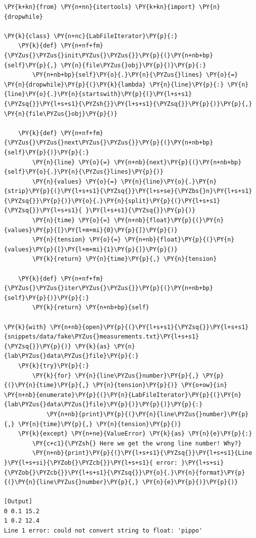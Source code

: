 \begin{Verbatim}[label=\makebox{\url{https://github.com/lucabaldini/cmepda/tree/master/slides/latex/snippets/file\_iterator.py}},commandchars=\\\{\}]
\PY{k+kn}{from} \PY{n+nn}{itertools} \PY{k+kn}{import} \PY{n}{dropwhile}

\PY{k}{class} \PY{n+nc}{LabFileIterator}\PY{p}{:}
    \PY{k}{def} \PY{n+nf+fm}{\PYZus{}\PYZus{}init\PYZus{}\PYZus{}}\PY{p}{(}\PY{n+nb+bp}{self}\PY{p}{,} \PY{n}{file\PYZus{}obj}\PY{p}{)}\PY{p}{:}
        \PY{n+nb+bp}{self}\PY{o}{.}\PY{n}{\PYZus{}lines} \PY{o}{=} \PY{n}{dropwhile}\PY{p}{(}\PY{k}{lambda} \PY{n}{line}\PY{p}{:} \PY{n}{line}\PY{o}{.}\PY{n}{startswith}\PY{p}{(}\PY{l+s+s1}{\PYZsq{}}\PY{l+s+s1}{\PYZsh{}}\PY{l+s+s1}{\PYZsq{}}\PY{p}{)}\PY{p}{,} \PY{n}{file\PYZus{}obj}\PY{p}{)}
        
    \PY{k}{def} \PY{n+nf+fm}{\PYZus{}\PYZus{}next\PYZus{}\PYZus{}}\PY{p}{(}\PY{n+nb+bp}{self}\PY{p}{)}\PY{p}{:}
        \PY{n}{line} \PY{o}{=} \PY{n+nb}{next}\PY{p}{(}\PY{n+nb+bp}{self}\PY{o}{.}\PY{n}{\PYZus{}lines}\PY{p}{)}
        \PY{n}{values} \PY{o}{=} \PY{n}{line}\PY{o}{.}\PY{n}{strip}\PY{p}{(}\PY{l+s+s1}{\PYZsq{}}\PY{l+s+se}{\PYZbs{}n}\PY{l+s+s1}{\PYZsq{}}\PY{p}{)}\PY{o}{.}\PY{n}{split}\PY{p}{(}\PY{l+s+s1}{\PYZsq{}}\PY{l+s+s1}{ }\PY{l+s+s1}{\PYZsq{}}\PY{p}{)}
        \PY{n}{time} \PY{o}{=} \PY{n+nb}{float}\PY{p}{(}\PY{n}{values}\PY{p}{[}\PY{l+m+mi}{0}\PY{p}{]}\PY{p}{)}
        \PY{n}{tension} \PY{o}{=} \PY{n+nb}{float}\PY{p}{(}\PY{n}{values}\PY{p}{[}\PY{l+m+mi}{1}\PY{p}{]}\PY{p}{)}
        \PY{k}{return} \PY{n}{time}\PY{p}{,} \PY{n}{tension}
    
    \PY{k}{def} \PY{n+nf+fm}{\PYZus{}\PYZus{}iter\PYZus{}\PYZus{}}\PY{p}{(}\PY{n+nb+bp}{self}\PY{p}{)}\PY{p}{:}
        \PY{k}{return} \PY{n+nb+bp}{self}

\PY{k}{with} \PY{n+nb}{open}\PY{p}{(}\PY{l+s+s1}{\PYZsq{}}\PY{l+s+s1}{snippets/data/fake\PYZus{}measurements.txt}\PY{l+s+s1}{\PYZsq{}}\PY{p}{)} \PY{k}{as} \PY{n}{lab\PYZus{}data\PYZus{}file}\PY{p}{:}
    \PY{k}{try}\PY{p}{:}
        \PY{k}{for} \PY{n}{line\PYZus{}number}\PY{p}{,} \PY{p}{(}\PY{n}{time}\PY{p}{,} \PY{n}{tension}\PY{p}{)} \PY{o+ow}{in} \PY{n+nb}{enumerate}\PY{p}{(}\PY{n}{LabFileIterator}\PY{p}{(}\PY{n}{lab\PYZus{}data\PYZus{}file}\PY{p}{)}\PY{p}{)}\PY{p}{:}
            \PY{n+nb}{print}\PY{p}{(}\PY{n}{line\PYZus{}number}\PY{p}{,} \PY{n}{time}\PY{p}{,} \PY{n}{tension}\PY{p}{)}
    \PY{k}{except} \PY{n+ne}{ValueError} \PY{k}{as} \PY{n}{e}\PY{p}{:}
        \PY{c+c1}{\PYZsh{} Here we get the wrong line number! Why?}
        \PY{n+nb}{print}\PY{p}{(}\PY{l+s+s1}{\PYZsq{}}\PY{l+s+s1}{Line }\PY{l+s+si}{\PYZob{}\PYZcb{}}\PY{l+s+s1}{ error: }\PY{l+s+si}{\PYZob{}\PYZcb{}}\PY{l+s+s1}{\PYZsq{}}\PY{o}{.}\PY{n}{format}\PY{p}{(}\PY{n}{line\PYZus{}number}\PY{p}{,} \PY{n}{e}\PY{p}{)}\PY{p}{)}

[Output]
0 0.1 15.2
1 0.2 12.4
Line 1 error: could not convert string to float: 'pippo'
\end{Verbatim}